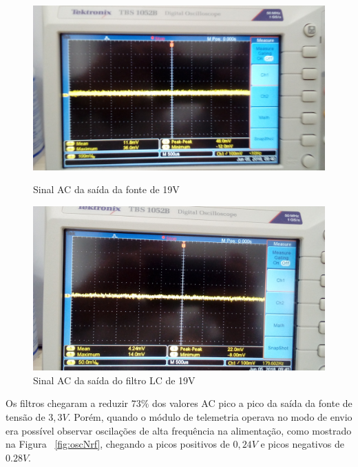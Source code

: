 \documentclass[
	12pt,				%
	openright,			%
	twoside,			%
	a4paper,			%
	english,			%
	french,				%
	spanish,			%
	brazil,				%
	]{abntex2}
\begin{document}
			\begin{figure}[!ht]
				\centering
				\begin{minipage}{0.4\linewidth}
					\centering
					\includegraphics[width = \linewidth]{../Fotos/antesFiltro19.jpg}
					\caption{Sinal AC da saída da fonte de 19V}
				\end{minipage}
				\hfill\vline\hfill
				\begin{minipage}{0.4\linewidth}
					\centering
					\includegraphics[width = \linewidth]{../Fotos/depoisFiltro19.jpg}
					\caption{Sinal AC da saída do filtro LC de 19V}
				\end{minipage}
			\end{figure}

			Os filtros chegaram a reduzir $73\%$ dos valores AC pico a
			pico da saída da fonte de tensão de $3,3V$. Porém, quando o
			módulo de telemetria operava no modo de envio era possível
			observar oscilações de alta frequência na alimentação, como
			mostrado na Figura ~\ref{fig:oscNrf}, chegando a picos positivos de $0,24V$
			e picos negativos de $0.28V$.
			
\end{document}
